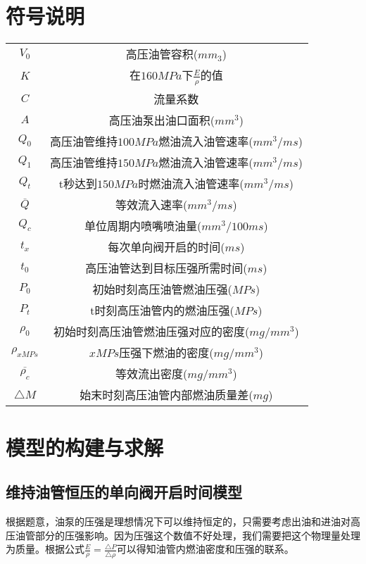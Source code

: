 \documentclass{cumcmthesis}
\begin{document}
\section{符号说明}
\begin{center}
	\begin{tabular}{cc}
		\toprule
		\makebox[0.3\textwidth][c]{符号}	&  \makebox[0.4\textwidth][c]{意义} \\ \midrule
		$V_{0}$	  & 高压油管容积($mm_{3}$)\\ 
		$K$       & 在$160MPa$下$\frac{E}{\rho}$的值\\
		$C$       & 流量系数\\
		$A$       & 高压油泵出油口面积($mm^{3}$)\\
		$Q_{0}$   & 高压油管维持$100MPa$燃油流入油管速率($mm^{3}/ms$)\\
		$Q_{1}$   & 高压油管维持$150MPa$燃油流入油管速率($mm^{3}/ms$)\\
		$Q_{t}$   & t秒达到$150MPa$时燃油流入油管速率($mm^{3}/ms$)\\
		$\overline{Q}$    & 等效流入速率($mm^{3}/ms$)\\
		$Q_{c}$   & 单位周期内喷嘴喷油量($mm^{3}/100ms$)\\
		$t_{x}$   & 每次单向阀开启的时间($ms$)\\
		$t_{0}$   & 高压油管达到目标压强所需时间($ms$)\\
		$P_{0}$   & 初始时刻高压油管燃油压强($MPs$)\\
		$P_{t}$   & t时刻高压油管内的燃油压强($MPs$)\\
		$\rho_{0}$   & 初始时刻高压油管燃油压强对应的密度($mg/mm^{3}$)\\
		$\rho_{xMPs}$   & $xMPs$压强下燃油的密度($mg/mm^{3}$)\\
		$\overline{\rho_{c}}$   & 等效流出密度($mg/mm^{3}$)\\
		${\triangle M}$   & 始末时刻高压油管内部燃油质量差($mg$)\\
		\bottomrule
	\end{tabular}
\end{center}
\section{模型的构建与求解}
\subsection{维持油管恒压的单向阀开启时间模型}
根据题意，油泵的压强是理想情况下可以维持恒定的，只需要考虑出油和进油对高压油管部分的压强影响。因为压强这个数值不好处理，我们需要把这个物理量处理为质量。根据公式$\frac{E}{\rho} = \frac{\triangle P}{\triangle \rho}$可以得知油管内燃油密度和压强的联系。
\end{document}
